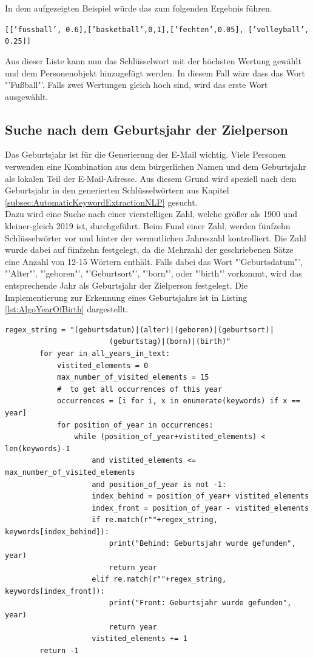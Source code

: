 		In dem aufgezeigten Beispiel würde das zum folgenden Ergebnis führen.
		
		\texttt{[['fussball', 0.6],['basketball',0,1],['fechten',0.05],
			['volleyball', 0.25]]}		
		
		Aus dieser Liste kann nun das Schlüsselwort mit der höchsten Wertung gewählt und dem Personenobjekt hinzugefügt werden. In diesem Fall wäre dass das Wort "'Fußball"'. Falls zwei Wertungen gleich hoch sind, wird das erste Wort ausgewählt.
		
		
	\subsection{Suche nach dem Geburtsjahr der Zielperson}
		Das Geburtsjahr ist für die Generierung der E-Mail wichtig. Viele Personen verwenden eine Kombination aus dem bürgerlichen Namen und dem Geburtsjahr als lokalen Teil der E-Mail-Adresse. Aus diesem Grund wird speziell nach dem Geburtsjahr in den generierten Schlüsselwörtern aus Kapitel \ref{subsec:AutomaticKeywordExtractionNLP} gesucht.\\
		Dazu wird eine Suche nach einer vierstelligen Zahl, welche größer als 1900 und kleiner-gleich 2019 ist, durchgeführt. Beim Fund einer Zahl, werden  fünfzehn Schlüsselwörter vor und hinter der vermutlichen Jahreszahl kontrolliert. Die Zahl wurde dabei auf fünfzehn festgelegt, da die Mehrzahl der geschriebenen Sätze eine Anzahl von 12-15 Wörtern enthält. \cite{seibicke1969schreibt} Falls dabei das Wort "'Geburtsdatum"', "'Alter"', "'geboren"', "'Geburtsort"', "'born"', oder "'birth"' vorkommt, wird das entsprechende Jahr als Geburtsjahr der Zielperson festgelegt. Die Implementierung zur Erkennung eines Geburtsjahrs ist in Listing \ref{lst:AlgoYearOfBirth} dargestellt.\\
		
		\begin{lstlisting}[caption=Algorithmus zur Suche nach dem Geburtsjahr,label={lst:AlgoYearOfBirth}]
		regex_string = "(geburtsdatum)|(alter)|(geboren)|(geburtsort)|	
						(geburtstag)|(born)|(birth)"
		for year in all_years_in_text:
			vistited_elements = 0
			max_number_of_visited_elements = 15
			#  to get all occurrences of this year
			occurrences = [i for i, x in enumerate(keywords) if x == year]
			for position_of_year in occurrences:
				while (position_of_year+vistited_elements) < len(keywords)-1 
					and vistited_elements <= max_number_of_visited_elements 
					and position_of_year is not -1:
					index_behind = position_of_year+ vistited_elements
					index_front = position_of_year - vistited_elements
					if re.match(r""+regex_string, keywords[index_behind]):
						print("Behind: Geburtsjahr wurde gefunden", year)
						return year
					elif re.match(r""+regex_string, keywords[index_front]):
						print("Front: Geburtsjahr wurde gefunden", year)
						return year
					vistited_elements += 1
		return -1
		\end{lstlisting} 
		
